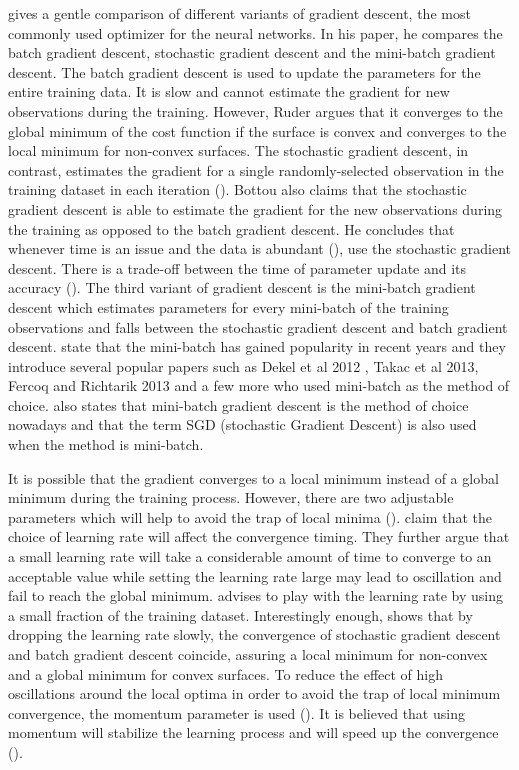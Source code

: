 \cite{ruder2016overview} gives a gentle comparison of different variants of gradient descent, the most commonly used optimizer for the neural networks. In his paper, he compares the batch gradient descent, stochastic gradient descent and the mini-batch gradient descent. The batch gradient descent is used to update the parameters for the entire training data. It is slow and cannot estimate the gradient for new observations during the training.  However, Ruder argues that it converges to the global minimum of the cost function if the surface is convex and converges to the local minimum for non-convex surfaces. The stochastic gradient descent, in contrast, estimates the gradient for a single randomly-selected observation in the training dataset in each iteration (\cite{bottou2012stochastic}). Bottou also claims that the stochastic gradient descent is able to estimate the gradient for the new observations during the training as opposed to the batch gradient descent. He concludes that whenever time is an issue and the data is abundant (\cite{bottou2010large}), use the stochastic gradient descent. There is a trade-off between the time of parameter update and its accuracy (\cite{ruder2016overview}). The third variant of gradient descent is the mini-batch gradient descent which estimates parameters for every mini-batch of the training observations and falls between the stochastic gradient descent and batch gradient descent. \cite{shalev2013accelerated} state that the mini-batch has gained popularity in recent years and they introduce several popular papers such as Dekel et al 2012 , Takac et al 2013, Fercoq and Richtarik 2013 and a few more who used mini-batch as the method of choice. \cite{ruder2016overview} also states that mini-batch gradient descent is the method of choice nowadays and that the term SGD (stochastic Gradient Descent) is also used when the method is mini-batch.

It is possible that the gradient converges to a local minimum instead of a global minimum during the training process. However, there are two adjustable parameters which will help to avoid the trap of local minima (\cite{sibanda2012artificial}). \cite{riedmiller1993direct} claim that the choice of learning rate will affect the convergence timing. They further argue that a small learning rate will take a considerable amount of time to converge to an acceptable value while setting the learning rate large may lead to oscillation and fail to reach the global minimum. \cite{bottou2012stochastic} advises to play with the learning rate by using a small fraction of the training dataset. Interestingly enough, \cite{ruder2016overview} shows that by dropping the learning rate slowly, the convergence of stochastic gradient descent and batch gradient descent coincide, assuring a local minimum for non-convex and a global minimum for convex surfaces. To reduce the effect of high oscillations around the local optima in order to avoid the trap of local minimum convergence, the momentum parameter is used (\cite{rumelhart1986learning}). It is believed that using momentum will stabilize the learning process and will speed up the convergence (\cite{riedmiller1993direct}).


